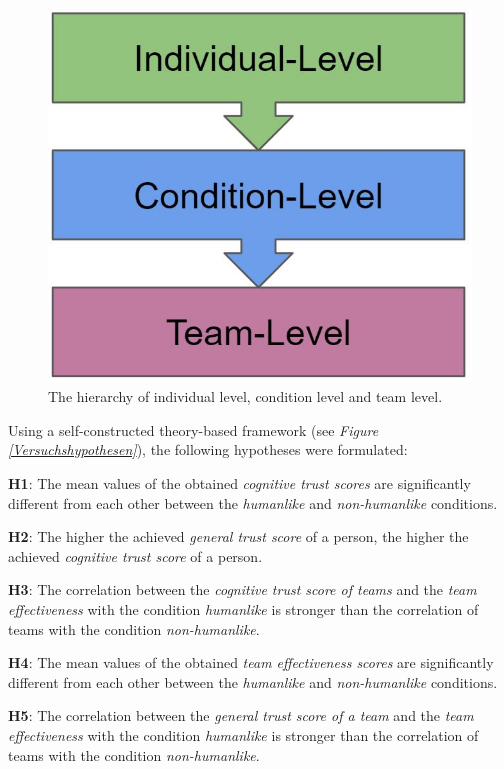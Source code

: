 \documentclass[sigchi]{acmart}
\begin{document}
\begin{figure}[h]
  \centering
 		\includegraphics[width=0.5\linewidth]{Abbildungen/DifferentLevels.JPG}	
			\caption[The hierarchy levels]{The hierarchy of individual level, condition level and team level.}
			\label{DifferentLevels}
\end{figure}	
	
Using a self-constructed theory-based framework (see \textit{Figure \ref{Versuchshypothesen}}), the following hypotheses were formulated:

\textbf{H1}: The mean values of the obtained \textit{cognitive trust scores} are significantly different from each other between the \textit{humanlike} and \textit{non-humanlike} conditions.

\textbf{H2}: The higher the achieved \textit{general trust score} of a person, the higher the achieved \textit{cognitive trust score} of a person.

\textbf{H3}: The correlation between the \textit{cognitive trust score of teams} and the \textit{team effectiveness} with the condition \textit{humanlike} is stronger than the correlation of teams with the condition \textit{non-humanlike}.

\textbf{H4}: The mean values of the obtained \textit{team effectiveness scores} are significantly different from each other between the \textit{humanlike} and \textit{non-humanlike} conditions.

\textbf{H5}: The correlation between the \textit{general trust score of a team} and the \textit{team effectiveness} with the condition \textit{humanlike} is stronger than the correlation of teams with the condition \textit{non-humanlike}.
\end{document}
